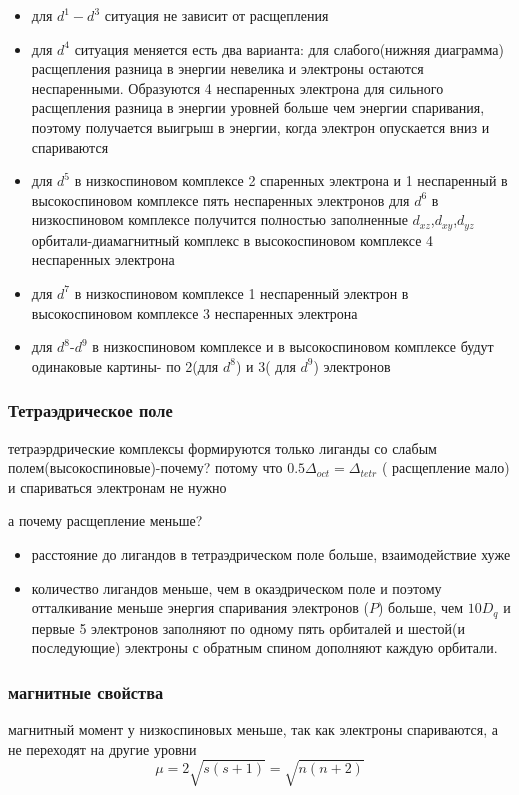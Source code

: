  \begin{itemize}
 \item для $d^1-d^3$ ситуация не зависит от расщепления \item для $d^4$ ситуация меняется есть два варианта: для слабого(нижняя диаграмма) расщепления разница в энергии невелика и электроны остаются неспаренными. Образуются 4 неспаренных электрона  для сильного расщепления разница в энергии уровней больше чем энергии спаривания, поэтому получается выигрыш в энергии, когда электрон опускается вниз и спариваются \item для $d^5$ в низкоспиновом комплексе 2 спаренных электрона и 1 неспаренный в высокоспиновом комплексе пять неспаренных электронов для $d^6$ в низкоспиновом комплексе получится полностью заполненные $d_{xz}$,$d_{xy}$,$d_{yz}$ орбитали-диамагнитный комплекс в высокоспиновом комплексе 4 неспаренных электрона 
 \item для $d^7$ в низкоспиновом комплексе 1 неспаренный электрон в высокоспиновом комплексе 3 неспаренных электрона 
 \item для $d^8$-$d^9$ в низкоспиновом комплексе и в высокоспиновом комплексе будут одинаковые картины- по 2(для $d^8$) и 3( для $d^9$) электронов 
 \end{itemize}

\subsubsection*{Тетраэдрическое поле}
тетраэрдрические комплексы формируются только лиганды со слабым полем(высокоспиновые)-почему? потому что $0.5\Delta_{oct}=\Delta_{tetr}$ ( расщепление мало) и спариваться электронам не нужно

а почему расщепление меньше?
\begin{itemize}
\item расстояние до лигандов в тетраэдрическом поле больше, взаимодействие хуже 
\item количество лигандов меньше, чем в окаэдрическом поле и поэтому отталкивание меньше энергия спаривания электронов ($P$) больше, чем $10D_q$ и первые 5 электронов заполняют по одному пять орбиталей и шестой(и последующие) электроны с обратным спином дополняют каждую орбитали. 
\end{itemize}

\subsubsection{магнитные свойства}
 магнитный момент у низкоспиновых меньше, так как электроны спариваются, а не переходят на другие уровни 
$$\mu=2\sqrt{s(s+1)}=\sqrt{n(n+2)}$$ 

